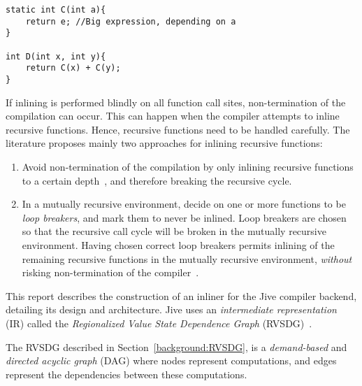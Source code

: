 \begin{centering}
	\noindent\begin{minipage}{\textwidth}
		\begin{CenteredBox}
		\begin{lstlisting}[style=global_customcpp]
static int C(int a){
	return e; //Big expression, depending on a
}

int D(int x, int y){
	return C(x) + C(y);
}
		\end{lstlisting}
		\end{CenteredBox}
	\end{minipage}
	\label{lst:code-dup}
\end{centering}

If inlining is performed blindly on all function call sites, non-termination of
the compilation can occur. This can happen when the compiler attempts to inline
recursive functions. Hence, recursive functions need to be handled carefully.
The literature proposes mainly two approaches for inlining recursive functions:

\begin{enumerate}

	\item Avoid non-termination of the compilation by only inlining recursive
functions to a certain depth~\cite{GHCPaper,InlineWhenHowSerrano}, and
therefore breaking the recursive cycle.

	\item In a mutually recursive environment, decide on one or more functions
to be \textit{loop breakers}, and mark them to never be inlined. Loop breakers
are chosen so that the recursive call cycle will be broken in the mutually
recursive environment. Having chosen correct loop breakers permits inlining of
the remaining recursive functions in the mutually recursive environment,
\textit{without} risking non-termination of the
compiler~\cite{BasMscThesis,GHCPaper}.

\end{enumerate}

This report describes the construction of an inliner for the Jive compiler
backend, detailing its design and architecture. Jive uses an
\textit{intermediate representation} (IR) called the \textit{Regionalized Value
State Dependence Graph} (RVSDG)~\cite{RVSDG:HiPEACpaper}.

The RVSDG described in Section~\ref{background:RVSDG},
is a \textit{demand-based} and \textit{directed acyclic graph} (DAG) where nodes
represent computations, and edges represent the dependencies between these
computations.

